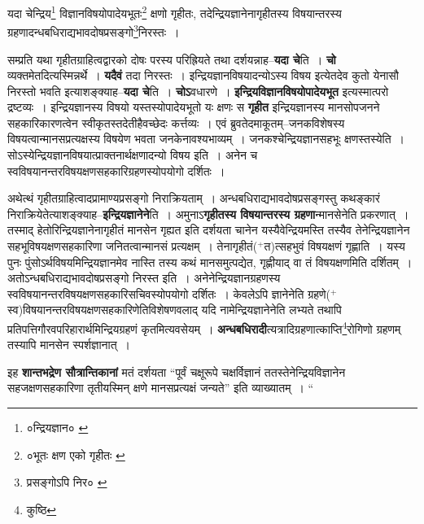 \documentclass[article,12pt,a4paper]{memoir}
\newcommand{\add}[1]{($^{+}$#1)}
\begin{document}
	  \pstart यदा चेन्द्रिय\footnote{०न्द्रियज्ञान० \cite{dp-msA} \cite{dp-msB} \cite{dp-msC} \cite{dp-edP} \cite{dp-edH} \cite{dp-edE} \cite{dp-edN}} विज्ञानविषयोपादेयभूतः\footnote{०भूतः क्षण एको गृहीतः \cite{dp-msD}} क्षणो गृहीतः, तदेन्द्रियज्ञानेनागृहीतस्य विषयान्तरस्य ग्रहणादन्धबधिराद्यभावदोषप्रसङ्गो\footnote{प्रसङ्गोऽपि निर० \cite{dp-msD}}निरस्तः ।
	\pend
      
	  \endgroup
	

	  \pstart सम्प्रति यथा गृहीतग्राहित्वद्वारको दोषः परस्य परिह्रियते तथा दर्शयन्नाह--\textbf{यदा चे}ति । \textbf{चो} व्यक्तमेतदित्यस्मिन्नर्थे । \textbf{यदैवं} तदा निरस्तः । इन्द्रियज्ञानविषयादन्योऽस्य विषय इत्येतदेव कुतो येनासौ निरस्तो भवति इत्याशङ्क्याह--\textbf{यदा चे}ति । \textbf{चोऽ}वधारणे । \textbf{इन्द्रियविज्ञानविषयोपादेयभूत} इत्यस्मात्परो द्रष्टव्यः । इन्द्रियज्ञानस्य विषयो यस्तस्योपादेयभूतो यः क्षणः स \textbf{गृहीत} इन्द्रियज्ञानस्य मानसोपजनने सहकारिकारणत्वेन स्वीकृतस्तदेतीहैवच्छेदः कर्त्तव्यः । एवं ब्रुवतेदमाकूतम्--जनकविशेषस्य विषयत्वान्मानसप्रत्यक्षस्य विषयेण भवता जनकेनावश्यभाव्यम् । जनकश्चेन्द्रियज्ञानसहभूः क्षणस्तस्येति । सोऽस्येन्द्रियज्ञानविषयात्प्राक्तनार्थक्षणादन्यो विषय इति । अनेन च स्वविषयानन्तरविषयक्षणसहकारिग्रहणस्योपयोगो दर्शितः ।
	\pend
      

	  \pstart अथेत्थं गृहीतग्राहित्वादप्रामाण्यप्रसङ्गो निराक्रियताम् । अन्धबधिराद्यभावदोषप्रसङ्गस्तु कथङ्कारं निराक्रियेतेत्याशङ्क्याह--\textbf{इन्द्रियज्ञानेने}ति । अमुनाऽ\textbf{गृहीतस्य विषयान्तरस्य ग्रहणा}न्मानसेनेति प्रकरणात् । तस्माद् हेतोरिन्द्रियज्ञानेनागृहीतं मानसेन गृह्यत इति दर्शयता चानेन यस्यैवेन्द्रियमस्ति तस्यैव तेनेन्द्रियज्ञानेन सहभूविषयक्षणसहकारिणा जनितत्वान्मानसं प्रत्यक्षम् । तेनागृहीतं\add{त}त्सहभुवं विषयक्षणं गृह्णाति । यस्य पुनः पुंसोऽर्थविषयमिन्द्रियज्ञानमेव नास्ति तस्य कथं मानसमुत्पद्येत, गृह्णीयाद् वा तं विषयक्षणमिति दर्शितम् । अतोऽन्धबधिराद्यभावदोषप्रसङ्गो निरस्त इति । अनेनेन्द्रियज्ञानग्रहणस्य स्वविषयानन्तरविषयक्षणसहकारिसचिवस्योपयोगो दर्शितः । केवलेऽपि ज्ञानेनेति ग्रहणे\add{स्व}\leavevmode{}विषयानन्तरविषयक्षणसहकारिणेतिविशेषणवलाद् यदि नामेन्द्रियज्ञानेनेति लभ्यते तथापि प्रतिपत्तिगौरवपरिहारार्थमिन्द्रियग्रहणं कृतमित्यवसेयम् । \textbf{अन्धबधिरादी}त्यत्रादिग्रहणात्काप्ति\footnote{कुष्ठि}रोगिणो ग्रहणम् तस्यापि मानसेन स्पर्शज्ञानात् ।
	\pend
      

	  \pstart इह \textbf{शान्तभद्रेण सौत्रान्तिकानां} मतं दर्शयता “पूर्वं चक्षूरूपे चक्षर्विज्ञानं ततस्तेनेन्द्रियविज्ञानेन सहजक्षणसहकारिणा तृतीयस्मिन् क्षणे मानसप्रत्यक्षं जन्यते” इति व्याख्यातम् ।  \leavevmode{} “
	  
\end{document}

